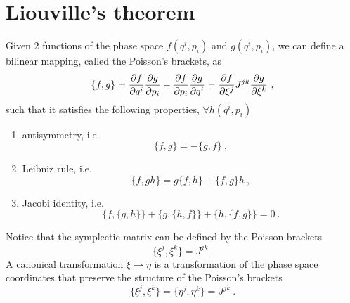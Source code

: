 \section{Liouville's theorem}

    Given $2$ functions of the phase space $f(q^i, p_i)$ and $g(q^i, p_i)$, we can define a bilinear mapping, called the Poisson's brackets, as
    \begin{equation}\label{cm:poi}
        \{f, g\} = \frac{\partial f}{\partial q^i} \frac{\partial g}{\partial p_i} - \frac{\partial f}{\partial p_i} \frac{\partial g}{\partial q^i} = \frac{\partial f}{\partial\xi^j} J^{jk} \frac{\partial g}{\partial\xi^k} ~,
    \end{equation}
    such that it satisfies the following properties, $\forall h(q^i, p_i)$
    \begin{enumerate}
        \item antisymmetry, i.e.
        \begin{equation*}
            \{f,g\} = - \{g, f\} ~,
        \end{equation*}
        \item Leibniz rule, i.e.
        \begin{equation*}
            \{f, gh\} = g \{f, h\} + \{f, g\} h ~,
        \end{equation*}
        \item Jacobi identity, i.e.
        \begin{equation*}
            \{f , \{g, h\}\} + \{g , \{h, f\}\} + \{h , \{f, g\}\} = 0  ~.
        \end{equation*} 
    \end{enumerate}
    Notice that the symplectic matrix can be defined by the Poisson brackets
    \begin{equation*}
        \{\xi^j, \xi^k \} = J^{jk} ~.
    \end{equation*}
    A canonical transformation $\xi \rightarrow \eta$ is a transformation of the phase space coordinates that preserve the structure of the Poisson's brackets 
    \begin{equation*}
        \{\xi^j, \xi^k\} = \{\eta^j, \eta^k\} = J^{jk} ~.
    \end{equation*}

